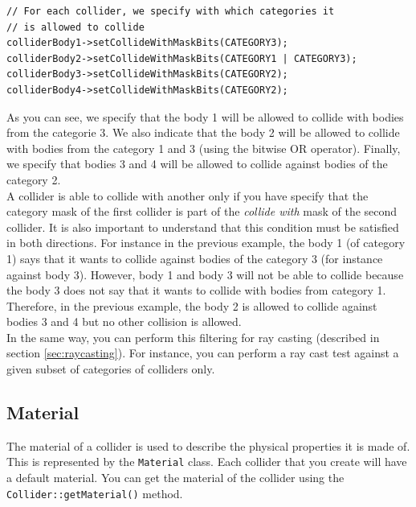 \documentclass[a4paper,12pt]{article}
\begin{document}
    \begin{lstlisting}
// For each collider, we specify with which categories it
// is allowed to collide
colliderBody1->setCollideWithMaskBits(CATEGORY3);
colliderBody2->setCollideWithMaskBits(CATEGORY1 | CATEGORY3);
colliderBody3->setCollideWithMaskBits(CATEGORY2);
colliderBody4->setCollideWithMaskBits(CATEGORY2);
  \end{lstlisting}

    \vspace{0.6cm}

    As you can see, we specify that the body 1 will be allowed to collide with bodies from the categorie 3. We also indicate that the body 2 will be
    allowed to collide with bodies from the category 1 and 3 (using the bitwise OR operator). Finally, we specify that bodies 3 and 4 will be allowed
    to collide against bodies of the category 2. \\

    A collider is able to collide with another only if you have specify that the category mask of the first collider is part of the
    \emph{collide with} mask of the second collider. It is also important to understand that this condition must be satisfied in both directions. For
    instance in the previous example, the body 1 (of category 1) says that it wants to collide against bodies of the category 3 (for instance against
    body 3). However, body 1 and body 3 will not be able to collide because the body 3 does not say that it wants to collide
    with bodies from category 1. Therefore, in the previous example, the body 2 is allowed to collide against bodies 3 and 4 but no other collision
    is allowed. \\

    In the same way, you can perform this filtering for ray casting (described in section \ref{sec:raycasting}). For instance, you can perform a ray cast test
    against a given subset of categories of colliders only.

    \subsection{Material}
    \label{sec:material}

    The material of a collider is used to describe the physical properties it is made of. This is represented by the \texttt{Material} class. Each collider that you create will have a default material. You can get the material of the collider using the \texttt{Collider::\allowbreak getMaterial()} method. \\
\end{document}
